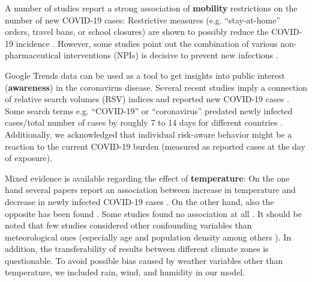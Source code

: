 \documentclass[]{elsarticle} %
\begin{document}
A number of studies report a strong association of \textbf{mobility}
restrictions on the number of new COVID-19 cases: Restrictive measures
(e.g. ``stay-at-home'' orders, travel bans, or school closures) are
shown to possibly reduce the COVID-19 incidence
\citep{chang_modeling_2020, Chinazzi395, fowler_effect_2020, kraemer_effect_2020, lasry_timing_2020, linka_outbreak_2020, mazzoli_effects_2020, xiong_data-driven_2020}.
However, some studies point out the combination of various
non-pharmaceutical interventions (NPIs) is decisive to prevent new
infections \citep{juni_impact_2020, lai_effect_2020}.

Google Trends \citep{google_trends} data can be used as a tool to get
insights into public interest (\textbf{awareness}) in the coronavirus
disease. Several recent studies imply a connection of relative search
volumes (RSV) indices and reported new COVID-19 cases
\citep{ayyoubzadeh_predicting_2020, effenberger_association_2020, higgins_correlations_2020, li_retrospective_2020, lin_google_2020, mavragani_tracking_2020, walker_use_2020, yuan_trends_2020, zhou_effects_2020}.
Some search terms e.g. ``COVID-19'' or ``coronavirus'' predated newly
infected cases/total number of cases by roughly 7 to 14 days for
different countries
\citep{effenberger_association_2020, higgins_correlations_2020, li_retrospective_2020, yuan_trends_2020}.
Additionally, we acknowledged that individual risk-aware behavior might
be a reaction to the current COVID-19 burden (measured as reported cases
at the day of exposure).

Mixed evidence is available regarding the effect of
\textbf{temperature}: On the one hand several papers report an
association between increase in temperature and decrease in newly
infected COVID-19 cases
\citep{bannister-tyrrell_preliminary_2020, demongeot_temperature_2020, liu_impact_2020, qi_covid-19_2020, shi_impact_2020, sobral_association_2020, tosepu_correlation_2020, Wang2020temperature, wu_effects_2020}.
On the other hand, also the opposite has been found
\citep{auler_evidence_2020, xie_association_2020}. Some studies found no
association at all
\citep{briz-redon_spatio-temporal_2020, iqbal_nexus_2020, jahangiri_sensitivity_2020, juni_impact_2020, yao_no_2020}.
It should be noted that few studies considered other confounding
variables than meteorological ones (especially age and population
density among others
\citep{briz-redon_spatio-temporal_2020, juni_impact_2020, wu_effects_2020}).
In addition, the transferability of results between different climate
zones is questionable. To avoid possible bias caused by weather
variables other than temperature, we included rain, wind, and humidity
in our model.
\end{document}
